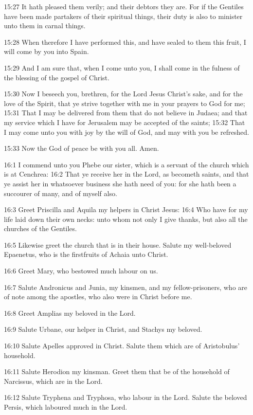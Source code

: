 15:27 It hath pleased them verily; and their debtors they are. For if the Gentiles have been made partakers of their spiritual things, their duty is also to minister unto them in carnal things.

15:28 When therefore I have performed this, and have sealed to them this fruit, I will come by you into Spain.

15:29 And I am sure that, when I come unto you, I shall come in the fulness of the blessing of the gospel of Christ.

15:30 Now I beseech you, brethren, for the Lord Jesus Christ's sake, and for the love of the Spirit, that ye strive together with me in your prayers to God for me; 15:31 That I may be delivered from them that do not believe in Judaea; and that my service which I have for Jerusalem may be accepted of the saints; 15:32 That I may come unto you with joy by the will of God, and may with you be refreshed.

15:33 Now the God of peace be with you all. Amen.

16:1 I commend unto you Phebe our sister, which is a servant of the church which is at Cenchrea: 16:2 That ye receive her in the Lord, as becometh saints, and that ye assist her in whatsoever business she hath need of you: for she hath been a succourer of many, and of myself also.

16:3 Greet Priscilla and Aquila my helpers in Christ Jesus: 16:4 Who have for my life laid down their own necks: unto whom not only I give thanks, but also all the churches of the Gentiles.

16:5 Likewise greet the church that is in their house. Salute my well-beloved Epaenetus, who is the firstfruits of Achaia unto Christ.

16:6 Greet Mary, who bestowed much labour on us.

16:7 Salute Andronicus and Junia, my kinsmen, and my fellow-prisoners, who are of note among the apostles, who also were in Christ before me.

16:8 Greet Amplias my beloved in the Lord.

16:9 Salute Urbane, our helper in Christ, and Stachys my beloved.

16:10 Salute Apelles approved in Christ. Salute them which are of Aristobulus' household.

16:11 Salute Herodion my kinsman. Greet them that be of the household of Narcissus, which are in the Lord.

16:12 Salute Tryphena and Tryphosa, who labour in the Lord. Salute the beloved Persis, which laboured much in the Lord.

